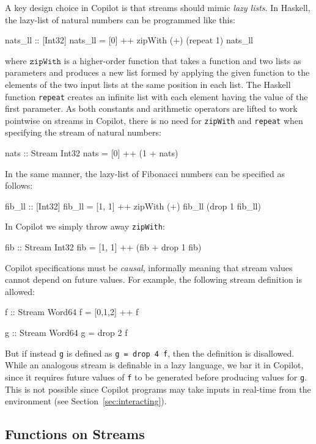A key design choice in Copilot is that streams should mimic \emph{lazy lists}.
In Haskell, the lazy-list of natural numbers can be programmed like this:
%
\begin{code}
nats_ll :: [Int32]
nats_ll = [0] ++ zipWith (+) (repeat 1) nats_ll
\end{code}
%
where $\texttt{zipWith}$ is a higher-order function that takes a
function and two lists as parameters and produces a new list formed by
applying the given function to the elements of the two input lists at
the same position in each list. The Haskell function \texttt{repeat}
creates an infinite list with each element having the value of the
first parameter.   As both constants and arithmetic
operators are lifted to work pointwise on streams in Copilot, there is
no need for {\tt zipWith} and {\tt repeat} when specifying the stream
of natural numbers:
%
\begin{code}
nats :: Stream Int32
nats = [0] ++ (1 + nats)
\end{code}
%
In the same manner, the lazy-list of Fibonacci numbers can be specified as follows:
%
\begin{code}
fib_ll :: [Int32]
fib_ll = [1, 1] ++ zipWith (+) fib_ll (drop 1 fib_ll)
\end{code}
%
In Copilot we simply throw away {\tt zipWith}:
\begin{code}
fib :: Stream Int32
fib = [1, 1] ++ (fib + drop 1 fib)
\end{code}

Copilot specifications must be \emph{causal}, informally meaning that
stream values cannot depend on future values.  For example, the following stream
definition is allowed:
%
\begin{code}
f :: Stream Word64
f = [0,1,2] ++ f

g :: Stream Word64
g = drop 2 f
\end{code}
%

But if instead {\tt g} is defined as {\tt g = drop 4 f}, then the definition is
disallowed.  While an analogous stream is definable in a lazy language, we bar
it in Copilot, since it requires future values of {\tt f} to be
generated before producing values for {\tt g}.  This is not possible since
Copilot programs may take inputs in real-time from the environment (see
Section~\ref{sec:interacting}).

\subsection{Functions on Streams} \label{sec:FnOnStreams}

